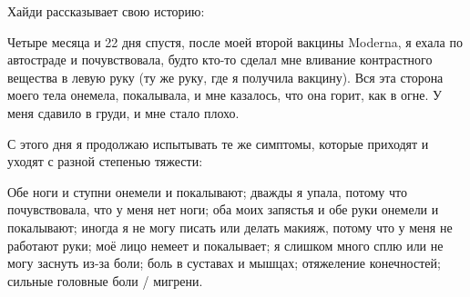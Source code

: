 Хайди рассказывает свою историю:

Четыре месяца и 22 дня спустя, после моей второй вакцины Moderna, я ехала по
автостраде и почувствовала, будто кто-то сделал мне вливание контрастного
вещества в левую руку (ту же руку, где я получила вакцину). Вся эта сторона
моего тела онемела, покалывала, и мне казалось, что она горит, как в огне. У
меня сдавило в груди, и мне стало плохо.

С этого дня я продолжаю испытывать те же симптомы, которые приходят и уходят с
разной степенью тяжести:

Обе ноги и ступни онемели и покалывают; дважды я упала, потому что
почувствовала, что у меня нет ноги; оба моих запястья и обе руки онемели и
покалывают; иногда я не могу писать или делать макияж, потому что у меня не
работают руки; моё лицо немеет и покалывает; я слишком много сплю или не могу
заснуть из-за боли; боль в суставах и мышцах; отяжеление конечностей; сильные
головные боли / мигрени.
